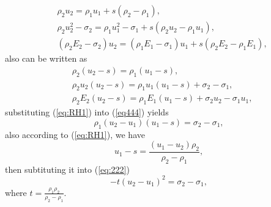 \documentclass[review]{elsarticle}
\begin{document}
\begin{align}
  &\rho_2u_2 = \rho_1 u_1 +s(\rho_2 -\rho_1),\\
  &\rho_2u_2^2-\sigma_{2} = \rho_1u_1^2-\sigma_{1}+s(\rho_2u_2-\rho_1u_1), \\
  &(\rho_2E_2-\sigma_{2})u_2 = (\rho_1E_1-\sigma_{1})u_1+s(\rho_2E_2-\rho_1E_1),
\end{align}
also can be written as
\begin{align}
\label{eq:RH1}
  &\rho_2(u_2-s) = \rho_1(u_1-s), \\
\label{eq444}
  &\rho_2u_2(u_2-s) = \rho_1u_1(u_1-s)+\sigma_2-\sigma_1,\\
\label{eq:RH3}
  &\rho_2E_2(u_2-s) = \rho_1E_1(u_1-s)+\sigma_2 u_2-\sigma_1u_1,
\end{align}
substituting (\ref{eq:RH1}) into (\ref{eq444}) yields  
\begin{equation}\label{eq:222}
  \rho_1(u_2-u_1)(u_1-s) = \sigma_2-\sigma_1,
\end{equation}
also according to (\ref{eq:RH1}), we have 
\begin{equation}
  u_1-s = \frac{(u_1 - u_2)\rho_2}{\rho_2 -\rho_1},
\end{equation}
then subtituting it into (\ref{eq:222})
\begin{equation}\label{eq:u2u1}
  -t(u_2-u_1)^2 = \sigma_2-\sigma_1,
\end{equation}
where $ t=\frac{\rho_1 \rho_2}{\rho_2-\rho_1}$. 
\end{document}
